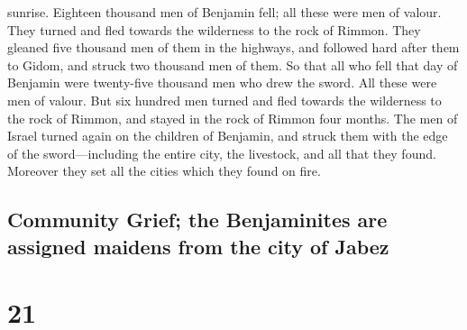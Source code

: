 sunrise.  Eighteen thousand men of Benjamin fell; all
these were men of valour.  They turned and fled towards
the wilderness to the rock of Rimmon. They gleaned five thousand men of
them in the highways, and followed hard after them to Gidom, and struck
two thousand men of them.  So that all who fell that day
of Benjamin were twenty-five thousand men who drew the sword. All these
were men of valour.  But six hundred men turned and fled
towards the wilderness to the rock of Rimmon, and stayed in the rock of
Rimmon four months.  The men of Israel turned again on
the children of Benjamin, and struck them with the edge of the
sword---including the entire city, the livestock, and all that they
found. Moreover they set all the cities which they found on fire.

\hypertarget{community-grief-the-benjaminites-are-assigned-maidens-from-the-city-of-jabez}{%
\subsection{Community Grief; the Benjaminites are assigned maidens from
the city of
Jabez}\label{community-grief-the-benjaminites-are-assigned-maidens-from-the-city-of-jabez}}

\hypertarget{section-20}{%
\section{21}\label{section-20}}

